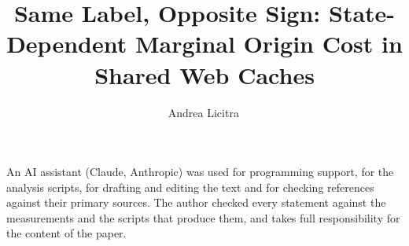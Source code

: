 \documentclass[runningheads]{llncs}
\title{Same Label, Opposite Sign: State-Dependent Marginal Origin Cost in Shared Web
       Caches}
\author{Andrea Licitra\,\orcidlink{0009-0006-9785-5495}}
\institute{Independent Researcher, Rome, Italy}
\begin{document}
\maketitle

\begin{abstract}

\end{abstract}










\begin{credits}
\subsubsection{\ackname}
An AI assistant (Claude, Anthropic) was used for programming support, for the analysis
scripts, for drafting and editing the text and for checking references against their
primary sources.
The author checked every statement against the measurements and the scripts that produce
them, and takes full responsibility for the content of the paper.
\end{credits}




\appendix


\clearpage

\end{document}
